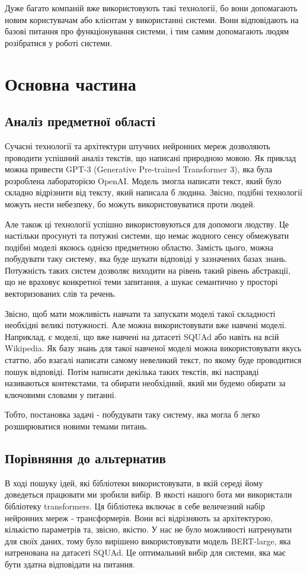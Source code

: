 \documentclass[a4paper,14pt]{extreport}
\newcommand\chap[1]{%
  \chapter*{#1}%
  \addcontentsline{toc}{chapter}{#1}}
\begin{document}
    Дуже багато компаній вже використовують такі технології, бо вони допомагають новим користувачам або клієнтам у використанні системи. Вони відповідають на базові питання про функціонування системи, і тим самим допомагають людям розібратися у роботі системи. 

\chap{Основна частина}
\section{Аналіз предметної області}
    Сучасні технології та архітектури штучних нейронних мереж дозволяють проводити успішний аналіз текстів, що написані природною мовою. Як приклад можна привести GPT-3 (Generative Pre-trained Transformer 3), яка була розроблена лабораторією OpenAI. Модель змогла написати текст, який було складно відрізнити від тексту, який написала б людина. Звісно, подібні технології можуть нести небезпеку, бо можуть використовуватися проти людей.

    Але також ці технології успішно використовуються для допомоги людству. Це настільки просунуті та потужні системи, що немає жодного сенсу обмежувати подібні моделі якоюсь однією предметною областю. Замість цього, можна побудувати таку систему, яка буде шукати відповіді у зазначених базах знань. Потужність таких систем дозволяє виходити на рівень такий рівень абстракції, що не враховує конкретної теми запитання, а шукає семантично у просторі векторизованих слів та речень.

    Звісно, щоб мати можливість навчати та запускати моделі такої складності необхідні великі потужності. Але можна використовувати вже навчені моделі. Наприклад, є моделі, що вже навчені на датасеті SQUAd або навіть на всій Wikipedia. Як базу знань для такої навченої моделі можна використовувати якусь статтю, або взагалі написати самому невеликий текст, по якому буде проводитися пошук відповіді. Потім написати декілька таких текстів, які насправді називаються контекстами, та обирати необхідний, який ми будемо обирати за ключовими словами у питанні.

    Тобто, постановка задачі - побудувати таку систему, яка могла б легко розширюватися новими темами питань.

\section{Порівняння до альтернатив}
    В ході пошуку ідей, які бібліотеки використовувати, в якій середі йому доведеться працювати ми зробили вибір. В якості  нашого бота ми використали бібліотеку transformers. Ця бібліотека включає в себе величезний набір нейронних мереж - трансформерів. Вони всі відрізняють за архітектурою, кількістю параметрів та, звісно, якістю. У нас не було можливості натренувати для своїх даних, тому було вирішено використовувати модель BERT-large, яка натренована на датасеті SQUAd. Це оптимальний вибір для системи, яка має бути здатна відповідати на питання. 
\end{document}

